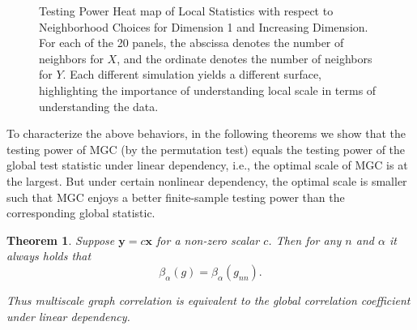 \documentclass[11pt]{article}
\providecommand{\mb}[1]{\boldsymbol{#1}}
\newtheorem{thm}{Theorem}
\begin{document}
\begin{figure}[htbp]
\hfil
{}
\caption{Testing Power Heat map of Local Statistics with respect to Neighborhood Choices for Dimension 1 and Increasing Dimension.
For each of the 20 panels, the abscissa denotes the number of neighbors for $X$, and the ordinate denotes the number of neighbors for $Y$.  Each different simulation yields a different surface, highlighting the importance of understanding local scale in terms of understanding the data.}
\label{figSim2}
\end{figure}

To characterize the above behaviors, in the following theorems we show that the testing power of MGC (by the permutation test) equals the testing power of the global test statistic under linear dependency, i.e., the optimal scale of MGC is at the largest. But under certain nonlinear dependency, the optimal scale is smaller such that MGC enjoys a better finite-sample testing power than the corresponding global statistic. 

\begin{thm}
\label{thm2}
Suppose $\mb{y}=c\mb{x}$ for a non-zero scalar $c$. Then for any $n$ and $\alpha$ it always holds that
\begin{equation}
\beta_{\alpha}(g) = \beta_{\alpha}(g_{nn}).
\end{equation}

Thus multiscale graph correlation is equivalent to the global correlation coefficient under linear dependency.
\end{thm}
\end{document}
